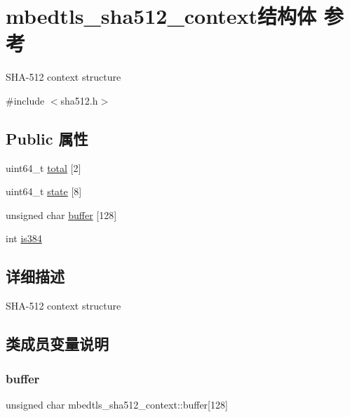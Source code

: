 \hypertarget{structmbedtls__sha512__context}{}\section{mbedtls\+\_\+sha512\+\_\+context结构体 参考}
\label{structmbedtls__sha512__context}


S\+H\+A-\/512 context structure  




{\ttfamily \#include $<$sha512.\+h$>$}

\subsection*{Public 属性}
\begin{DoxyCompactItemize}
\item 
uint64\+\_\+t \hyperlink{structmbedtls__sha512__context_a0c0c3f28093d6107c549d235bcd50726}{total} \mbox{[}2\mbox{]}
\item 
uint64\+\_\+t \hyperlink{structmbedtls__sha512__context_a9c7c627cf1904c576244eaca0c5d7928}{state} \mbox{[}8\mbox{]}
\item 
unsigned char \hyperlink{structmbedtls__sha512__context_a81d3accbf0fd1c5d5e1dfbabca0b15f8}{buffer} \mbox{[}128\mbox{]}
\item 
int \hyperlink{structmbedtls__sha512__context_a5061492d17d1a77471e61b0353db4e58}{is384}
\end{DoxyCompactItemize}


\subsection{详细描述}
S\+H\+A-\/512 context structure 

\subsection{类成员变量说明}
\mbox{\label{structmbedtls__sha512__context_a81d3accbf0fd1c5d5e1dfbabca0b15f8}} 
\subsubsection{\texorpdfstring{buffer}{buffer}}
{\footnotesize\ttfamily unsigned char mbedtls\+\_\+sha512\+\_\+context\+::buffer\mbox{[}128\mbox{]}}

